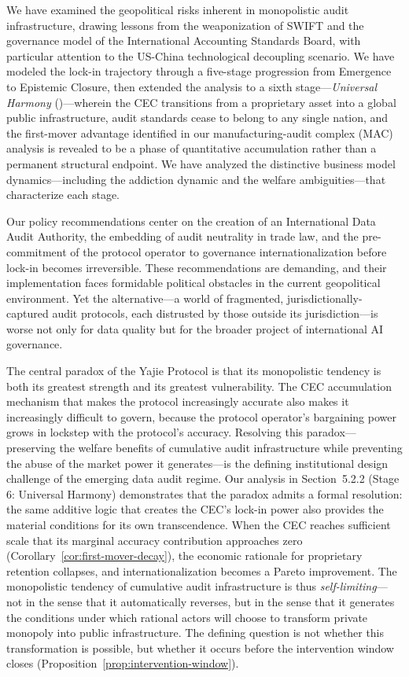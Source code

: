 \documentclass[12pt,a4paper]{article}
\theoremstyle{definition}
\theoremstyle{remark}
\begin{document}
We have examined the geopolitical risks inherent in monopolistic audit infrastructure, drawing lessons from the weaponization of SWIFT and the governance model of the International Accounting Standards Board, with particular attention to the US-China technological decoupling scenario. We have modeled the lock-in trajectory through a five-stage progression from Emergence to Epistemic Closure, then extended the analysis to a sixth stage—\textit{Universal Harmony} ()—wherein the CEC transitions from a proprietary asset into a global public infrastructure, audit standards cease to belong to any single nation, and the first-mover advantage identified in our manufacturing-audit complex (MAC) analysis is revealed to be a phase of quantitative accumulation rather than a permanent structural endpoint. We have analyzed the distinctive business model dynamics—including the addiction dynamic and the welfare ambiguities—that characterize each stage.

Our policy recommendations center on the creation of an International Data Audit Authority, the embedding of audit neutrality in trade law, and the pre-commitment of the protocol operator to governance internationalization before lock-in becomes irreversible. These recommendations are demanding, and their implementation faces formidable political obstacles in the current geopolitical environment. Yet the alternative—a world of fragmented, jurisdictionally-captured audit protocols, each distrusted by those outside its jurisdiction—is worse not only for data quality but for the broader project of international AI governance.

The central paradox of the Yajie Protocol is that its monopolistic tendency is both its greatest strength and its greatest vulnerability. The CEC accumulation mechanism that makes the protocol increasingly accurate also makes it increasingly difficult to govern, because the protocol operator's bargaining power grows in lockstep with the protocol's accuracy. Resolving this paradox—preserving the welfare benefits of cumulative audit infrastructure while preventing the abuse of the market power it generates—is the defining institutional design challenge of the emerging data audit regime. Our analysis in Section~5.2.2 (Stage 6: Universal Harmony) demonstrates that the paradox admits a formal resolution: the same additive logic that creates the CEC's lock-in power also provides the material conditions for its own transcendence. When the CEC reaches sufficient scale that its marginal accuracy contribution approaches zero (Corollary~\ref{cor:first-mover-decay}), the economic rationale for proprietary retention collapses, and internationalization becomes a Pareto improvement. The monopolistic tendency of cumulative audit infrastructure is thus \textit{self-limiting}—not in the sense that it automatically reverses, but in the sense that it generates the conditions under which rational actors will choose to transform private monopoly into public infrastructure. The defining question is not whether this transformation is possible, but whether it occurs before the intervention window closes (Proposition~\ref{prop:intervention-window}).
\end{document}
